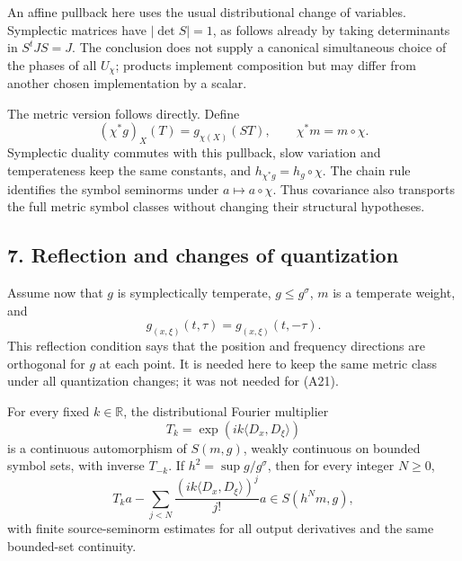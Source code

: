 \documentclass[
  11pt,
]{article}
\begin{document}
An affine pullback here uses the usual distributional change of
variables. Symplectic matrices have \(|\det S|=1\), as follows already
by taking determinants in \(S^tJS=J\). The conclusion does not supply a
canonical simultaneous choice of the phases of all \(U_\chi\); products
implement composition but may differ from another chosen implementation
by a scalar.

The metric version follows directly. Define \[
(\chi^*g)_X(T)=g_{\chi(X)}(ST),\qquad \chi^*m=m\circ\chi.
\tag{A32}
\] Symplectic duality commutes with this pullback, slow variation and
temperateness keep the same constants, and \(h_{\chi^*g}=h_g\circ\chi\).
The chain rule identifies the symbol seminorms under
\(a\mapsto a\circ\chi\). Thus covariance also transports the full metric
symbol classes without changing their structural hypotheses.

\subsection{7. Reflection and changes of
quantization}\label{reflection-and-changes-of-quantization}

Assume now that \(g\) is symplectically temperate, \(g\le g^\sigma\),
\(m\) is a temperate weight, and \[
g_{(x,\xi)}(t,\tau)=g_{(x,\xi)}(t,-\tau).
\tag{A33}
\] This reflection condition says that the position and frequency
directions are orthogonal for \(g\) at each point. It is needed here to
keep the same metric class under all quantization changes; it was not
needed for (A21).

For every fixed \(k\in\mathbb R\), the distributional Fourier multiplier
\[
T_k=\exp(i k\langle D_x,D_\xi\rangle)
\tag{A34}
\] is a continuous automorphism of \(S(m,g)\), weakly continuous on
bounded symbol sets, with inverse \(T_{-k}\). If
\(h^2=\sup g/g^\sigma\), then for every integer \(N\ge0\), \[
T_k a-\sum_{j<N}\frac{(ik\langle D_x,D_\xi\rangle)^j}{j!}a
\in S(h^Nm,g),
\tag{A35}
\] with finite source-seminorm estimates for all output derivatives and
the same bounded-set continuity.
\end{document}
